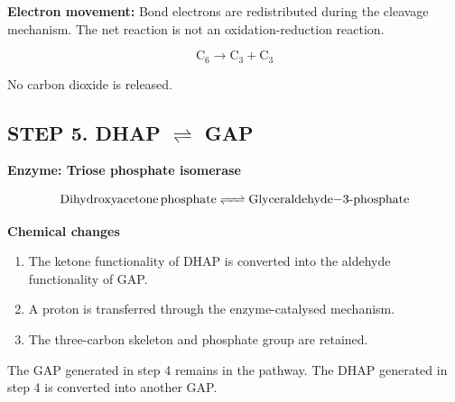 \documentclass[10pt,a4paper,landscape]{article}
\newcommand{\DHAP}{%
  \chemfig{
    HO-CH_2-C(=[2]O)-CH_2-O-P(=[2]O)(-[6]OH)-OH
  }%
}
\newcommand{\GAP}{%
  \chemfig{
    H-C(=[2]O)-C(-[2]OH)(-[6]H)
    -CH_2-O-P(=[2]O)(-[6]OH)-OH
  }%
}
\begin{document}
\textbf{Electron movement:} Bond electrons are redistributed during
the cleavage mechanism. The net reaction is not an oxidation-reduction
reaction.

\[
\boxed{\mathrm{C_6 \longrightarrow C_3+C_3}}
\]

No carbon dioxide is released.


\subsection*{STEP 5. DHAP $\rightleftharpoons$ GAP}

\textcolor{enz}{\textbf{Enzyme: Triose phosphate isomerase}}

\[
\ce{
Dihydroxyacetone phosphate
<=> Glyceraldehyde-3-phosphate
}
\]

\begin{center}
\end{center}

\textbf{Chemical changes}

\begin{enumerate}
  \item The ketone functionality of DHAP is converted into
  the aldehyde functionality of GAP.
  \item A proton is transferred through the enzyme-catalysed
  mechanism.
  \item The three-carbon skeleton and phosphate group are retained.
\end{enumerate}

The GAP generated in step 4 remains in the pathway. The DHAP
generated in step 4 is converted into another GAP.
\end{document}
